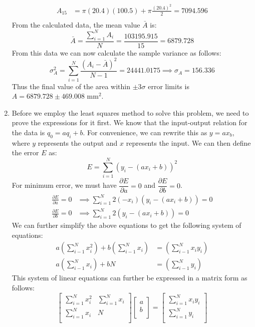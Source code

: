 \documentclass[a4paper, 11pt]{article}
\begin{document}
\begin{enumerate}[label=(\arabic*),leftmargin=*]
\begin{align*}
	A_{15}&=\pi(20.4)(100.5)+\pi\frac{(20.4)^2}{2}=7094.596\\
\end{align*}
From the calculated data, the mean value $\bar{A}$ is:
$$\bar{A}=\frac{\displaystyle\sum_{i=1}^N A_i}{N}=\frac{103195.915}{15}=6879.728$$
From this data we can now calculate the sample variance as follows:
$$\sigma_A^2=\sum_{i=1}^N \frac{(A_i-\bar{A})^2}{N-1}=24441.0175\implies \sigma_A=156.336$$
Thus the final value of the area within $\pm 3\sigma$ error limits is $\boxed{A=6879.728\pm 469.008\text{ mm}^2}$. 
\newpage
	\item Before we employ the least squares method to solve this problem, we need to prove the expressions for it first. We know that the input-output relation for the data is $q_0=aq_i+b$. For convenience, we can rewrite this as $y=ax_b$, where $y$ represents the output and $x$ represents the input. We can then define the error $E$ as:
	$$E=\sum_{i=1}^N(y_i-(ax_i+b))^2$$
For minimum error, we must have $\dfrac{\partial E}{\partial a}=0$ and $\dfrac{\partial E}{\partial b}=0$.
\begin{align*}
	\frac{\partial E}{\partial a}=0&\implies \sum_{i=1}^N 2(-x_i)(y_i-(ax_i+b))=0\\
	\frac{\partial E}{\partial b}=0&\implies \sum_{i=1}^N 2(y_i-(ax_i+b))=0
\end{align*} 
We can further simplify the above equations to get the following system of equations:
\begin{align*}
	a\left(\sum_{i-1}^N x_i^2\right)+b\left(\sum_{i-1}^N x_i\right)&=\left(\sum_{i-1}^N x_iy_i\right)\\
	a\left(\sum_{i-1}^N x_i\right)+bN&=\left(\sum_{i-1}^N y_i\right)
\end{align*}
This system of linear equations can further be expressed in a matrix form as follows:
$$\begin{bmatrix}
	\displaystyle\sum_{i=1}^N x_i^2 & \displaystyle\sum_{i=1}^N x_i\\
	\displaystyle\sum_{i=1}^N x_i & N\\
\end{bmatrix}\begin{bmatrix}
	a\\
	b\\
\end{bmatrix}=\begin{bmatrix}
	\displaystyle\sum_{i=1}^N x_iy_i\\
	\displaystyle\sum_{i=1}^N y_i\\
\end{bmatrix}$$

\end{enumerate}
\end{document}
